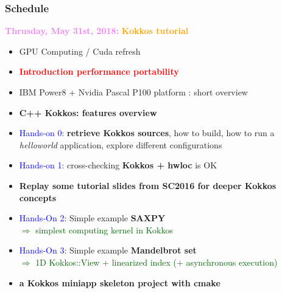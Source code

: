 \begin{frame}
  \frametitle{Schedule}

  {\bf \large \textcolor{violet}{Thrusday, May 31st, 2018:}} \textcolor{orange}{\bf Kokkos tutorial}
  \begin{itemize}
  \item GPU Computing / Cuda refresh %
  \item \textcolor{red}{\bf Introduction performance portability} %
  \item IBM Power8 + Nvidia Pascal P100 platform : short overview %
  \item \textbf{C++ Kokkos: features overview} %
  \item \textcolor{blue}{Hands-on 0:} \textbf{retrieve Kokkos sources}, how to build, how to run a \textit{helloworld} application, explore different configurations %
  \item \textcolor{blue}{Hands-on 1:} cross-checking \textbf{Kokkos + hwloc} is OK
  \item \textbf{Replay some tutorial slides from SC2016 for deeper Kokkos concepts}
  \item \textcolor{blue}{Hands-On 2:} Simple example \textbf{SAXPY}\\
    \textcolor{darkgreen}{$\Rightarrow$ simplest computing kernel in Kokkos} %
  \item \textcolor{blue}{Hands-On 3:} Simple example \textbf{Mandelbrot set}\\
    \textcolor{darkgreen}{$\Rightarrow$ 1D Kokkos::View + linearized index (+ asynchronous execution)} %
  \item {\bf a Kokkos miniapp skeleton project with cmake} 
  \end{itemize}
\end{frame}

